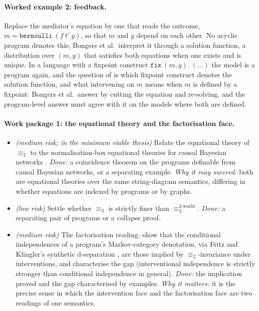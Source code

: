 \paragraph{Worked example 2: feedback.} Replace the mediator's equation by one that reads the outcome, $m = \mathtt{bernoulli}\ (f\ t'\ y)$, so that $m$ and $y$ depend on each other. No acyclic program denotes this; Bongers et al.\ interpret it through a solution function, a distribution over $(m, y)$ that satisfies both equations when one exists and is unique. In a language with a fixpoint construct $\mathtt{fix}\ (m, y).\ (\dots)$ the model is a program again, and the question of  is which fixpoint construct denotes the solution function, and what intervening on $m$ means when $m$ is defined by a fixpoint: Bongers et al.\ answer by cutting the equation and re-solving, and the program-level answer must agree with it on the models where both are defined.

\paragraph{Work package 1: the equational theory and the factorisation face.}
\begin{itemize}[nosep]
\item[1a] \textit{(medium risk; in the minimum viable thesis)} Relate the equational theory of $\equiv_2$ to the normalisation-box equational theories for causal Bayesian networks \cite{jacobsszelesstein2025inference,agrawal2026equational}. \emph{Done:} a coincidence theorem on the programs definable from causal Bayesian networks, or a separating example. \emph{Why it may succeed:} both are equational theories over the same string-diagram semantics, differing in whether equations are indexed by programs or by graphs.
\item[1b] \textit{(low risk)} Settle whether $\equiv_3$ is strictly finer than $\equiv_3^{\text{2-world}}$. \emph{Done:} a separating pair of programs or a collapse proof.
\item[1c] \textit{(medium risk)} The factorisation reading: show that the conditional independences of a program's Markov-category denotation, via Fritz and Klingler's synthetic d-separation \cite{fritz2023dseparation}, are those implied by $\equiv_2$-invariance under interventions, and characterise the gap (interventional independence is strictly stronger than conditional independence in general). \emph{Done:} the implication proved and the gap characterised by examples. \emph{Why it matters:} it is the precise sense in which the intervention face and the factorisation face are two readings of one semantics.
\end{itemize}

